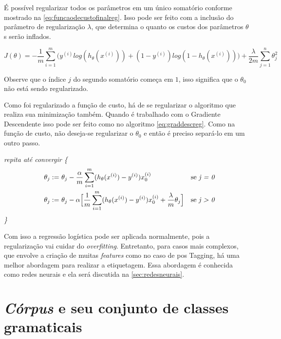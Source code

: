 É possível regularizar todos os parâmetros em um único somatório conforme mostrado na \autoref{eq:funcaodecustofinalreg}. Isso pode ser feito com a inclusão do parâmetro de regularização $\lambda$, que determina o quanto os custos dos parâmetros $\theta$s serão inflados.

\begin{equation} \label{eq:funcaodecustofinalreg}
J(\theta) = - \frac{1}{m}\sum\limits_{i=1}^{m}\Big( y^{(i)}log(h_{\theta}(x^{(i)})) + (1-y^{(i)})log(1 - h_{\theta}(x^{(i)})) \Big)
+ \frac{\lambda}{2m}\sum\limits_{j=1}^{n} \theta_j^2
\end{equation}

Observe que o índice $j$ do segundo somatório começa em $1$, isso significa que o $\theta_0$ não está sendo regularizado.

Como foi regularizado a função de custo, há de se regularizar o algoritmo que realiza sua minimização também. Quando é trabalhado com o Gradiente Descendente isso pode ser feito como no algoritmo \ref{eq:graddescreg}. Como na função de custo, não deseja-se regularizar o $\theta_0$ e então é preciso separá-lo em um outro passo.

\textit{repita até convergir \{}
\begin{align} 
\quad \theta_j := &\ \theta_j - \frac{\alpha}{m} \sum\limits_{i=1}^{m}(h_{\theta}(x^{(i)}) - y^{(i)}) x_0^{(i)} & \text{se \textit{j = 0}} \nonumber \\
\quad \theta_j := &\ \theta_j - \alpha \Big[ \frac{1}{m} \sum\limits_{i=1}^{m} (h_{\theta}(x^{(i)}) - y^{(i)}) x_0^{(i)} + \frac{\lambda}{m}\theta_j \Big] & \text{se \textit{j > 0}} \label{eq:graddescreg}
\end{align}
\textit{\quad\quad\quad \}}

Com isso a regressão logística pode ser aplicada normalmente, pois a regularização vai cuidar do \textit{overfitting}. Entretanto, para casos mais complexos, que envolve a criação de muitas \textit{features} como no caso de \ac{pos} Tagging, há uma melhor abordagem para realizar a etiquetagem. Essa abordagem é conhecida como redes neurais e ela será discutida na \autoref{sec:redesneurais}.











\section{\textit{Córpus} e seu conjunto de classes gramaticais}

